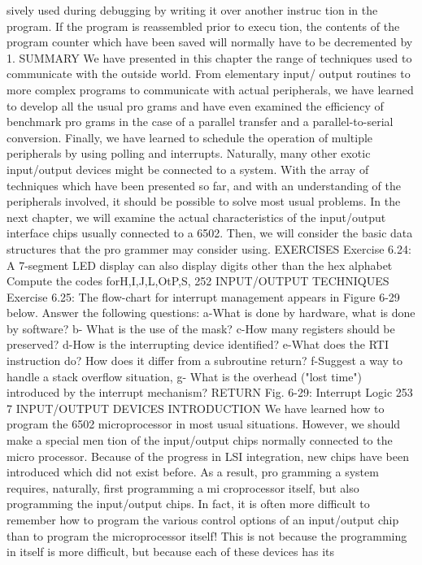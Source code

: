 \documentclass{book}
\begin{document}
sively used during debugging by writing it over another instruc
tion in the program. If the program is reassembled prior to execu
tion, the contents of the program counter which have been saved
will normally have to be decremented by 1.
SUMMARY
We have presented in this chapter the range of techniques used
to communicate with the outside world. From elementary input/
output routines to more complex programs to communicate with
actual peripherals, we have learned to develop all the usual pro
grams and have even examined the efficiency of benchmark pro
grams in the case of a parallel transfer and a parallel-to-serial
conversion. Finally, we have learned to schedule the operation of
multiple peripherals by using polling and interrupts. Naturally,
many other exotic input/output devices might be connected to a
system. With the array of techniques which have been presented
so far, and with an understanding of the peripherals involved, it
should be possible to solve most usual problems.
In the next chapter, we will examine the actual characteristics
of the input/output interface chips usually connected to a 6502.
Then, we will consider the basic data structures that the pro
grammer may consider using.
EXERCISES
Exercise 6.24: A 7-segment LED display can also display digits
other than the hex alphabet Compute the codes forH,I,J,L,OtP,S,
252
INPUT/OUTPUT TECHNIQUES
Exercise 6.25: The flow-chart for interrupt management appears
in Figure 6-29 below. Answer the following questions:
a-What is done by hardware, what is done by software?
b- What is the use of the mask?
c-How many registers should be preserved?
d-How is the interrupting device identified?
e-What does the RTI instruction do? How does it differ from
a subroutine return?
f-Suggest a way to handle a stack overflow situation,
g- What is the overhead ("lost time") introduced by the interrupt
mechanism?
RETURN
Fig. 6-29: Interrupt Logic
253
7
INPUT/OUTPUT DEVICES
INTRODUCTION
We have learned how to program the 6502 microprocessor in
most usual situations. However, we should make a special men
tion of the input/output chips normally connected to the micro
processor. Because of the progress in LSI integration, new chips
have been introduced which did not exist before. As a result, pro
gramming a system requires, naturally, first programming a mi
croprocessor itself, but also programming the input/output chips.
In fact, it is often more difficult to remember how to program the
various control options of an input/output chip than to program
the microprocessor itself! This is not because the programming in
itself is more difficult, but because each of these devices has its
\end{document}

